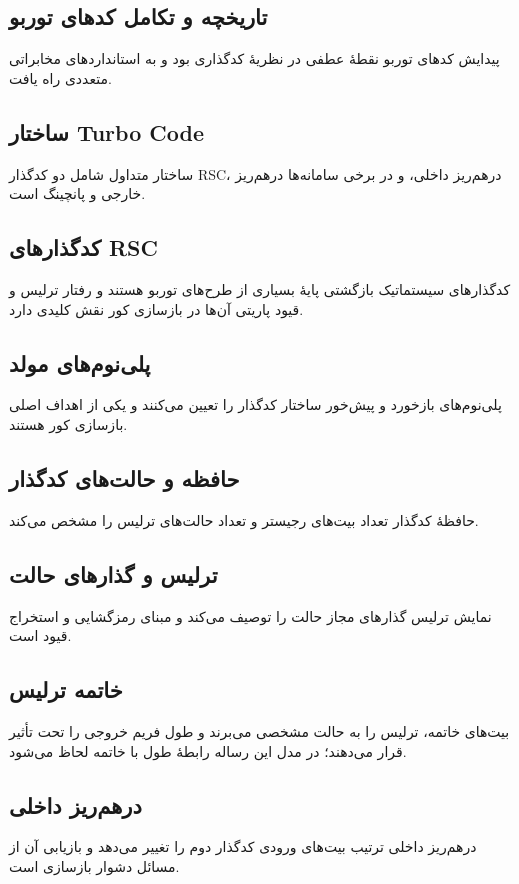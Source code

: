 \subsection{تاریخچه و تکامل کدهای توربو}
پیدایش کدهای توربو نقطهٔ عطفی در نظریهٔ کدگذاری بود
\cite{Berrou93}
و به استانداردهای مخابراتی متعددی راه یافت.

\subsection{ساختار Turbo Code}
ساختار متداول شامل دو کدگذار RSC، درهم‌ریز داخلی، و در برخی سامانه‌ها درهم‌ریز خارجی و پانچینگ است.

\subsection{کدگذارهای RSC}
کدگذارهای سیستماتیک بازگشتی پایهٔ بسیاری از طرح‌های توربو هستند و رفتار ترلیس و قیود پاریتی آن‌ها در بازسازی کور نقش کلیدی دارد.

\subsection{پلی‌نوم‌های مولد}
پلی‌نوم‌های بازخورد و پیش‌خور ساختار کدگذار را تعیین می‌کنند و یکی از اهداف اصلی بازسازی کور هستند.

\subsection{حافظه و حالت‌های کدگذار}
حافظهٔ کدگذار تعداد بیت‌های رجیستر و تعداد حالت‌های ترلیس را مشخص می‌کند.

\subsection{ترلیس و گذارهای حالت}
نمایش ترلیس گذارهای مجاز حالت را توصیف می‌کند و مبنای رمزگشایی و استخراج قیود است.

\subsection{خاتمه ترلیس}
بیت‌های خاتمه، ترلیس را به حالت مشخصی می‌برند و طول فریم خروجی را تحت تأثیر قرار می‌دهند؛ در مدل این رساله رابطهٔ طول با خاتمه لحاظ می‌شود.

\subsection{درهم‌ریز داخلی}
درهم‌ریز داخلی ترتیب بیت‌های ورودی کدگذار دوم را تغییر می‌دهد و بازیابی آن از مسائل دشوار بازسازی است.


